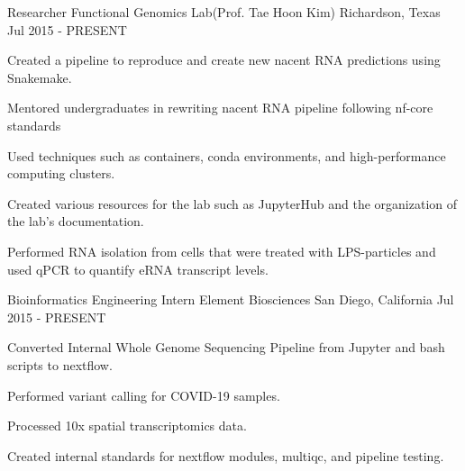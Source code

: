 

\begin{cventries}

	\cventry
	{Researcher} %
	{Functional Genomics Lab(Prof. Tae Hoon Kim)} %
	{Richardson, Texas} %
	{Jul 2015 - PRESENT} %
	{
		\begin{cvitems} %
			\item {Created a pipeline to reproduce and create new nacent RNA
					predictions using Snakemake.}
			\item {Mentored undergraduates in rewriting nacent RNA pipeline following nf-core standards}
			\item {Used techniques such as containers, conda environments, and
					high-performance computing clusters.}
			\item {Created various resources for the lab such as JupyterHub
					and the organization of the lab's documentation.}
			\item {Performed RNA isolation from cells that were treated with LPS-particles and used qPCR to quantify eRNA transcript levels.}
		\end{cvitems}
	}

	\cventry
	{Bioinformatics Engineering Intern} %
	{Element Biosciences} %
	{San Diego, California} %
	{Jul 2015 - PRESENT} %
	{
		\begin{cvitems} %
			\item {Converted Internal Whole Genome Sequencing Pipeline from Jupyter and bash scripts to nextflow.}
			\item {Performed variant calling for COVID-19 samples.}
			\item {Processed 10x spatial transcriptomics data.}
			\item {Created internal standards for nextflow modules, multiqc, and pipeline testing.}
		\end{cvitems}
	}



\end{cventries}
